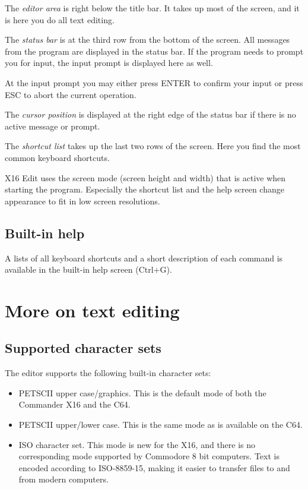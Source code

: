 \documentclass{article}
\begin{document}
        The \textit{editor area} is right below the title bar. It takes up most of the screen, and
        it is here you do all text editing.

        The \textit{status bar} is at the third row from the bottom of the screen. All messages
        from the program are displayed in the status bar. If the program needs to prompt you
        for input, the input prompt is displayed here as well. 
        
        At the input prompt you may either press ENTER to confirm your input or press ESC 
        to abort the current operation.

        The \textit{cursor position} is displayed at the right edge of the status bar if
        there is no active message or prompt.

        The \textit{shortcut list} takes up the last two rows of the screen. Here you find
        the most common keyboard shortcuts.
        
        X16 Edit uses the screen mode (screen height and width) that is active when starting
        the program. Especially the shortcut list and the help screen change appearance to fit in 
        low screen resolutions.

    \subsection{Built-in help}
        A lists of all keyboard shortcuts and a short description 
        of each command is available in the built-in help screen (Ctrl+G). 
    
\section{More on text editing}

    \subsection{Supported character sets}
        The editor supports the following built-in character sets:

        \begin{itemize}
            \item PETSCII upper case/graphics. This is the default mode of both the Commander X16 and the C64.

            \item PETSCII upper/lower case. This is the same mode as is available on the C64.

            \item ISO character set. This mode is new for the X16, and there is no corresponding mode 
            supported by Commodore 8 bit computers. Text is encoded according to ISO-8859-15, making it
            easier to transfer files to and from modern computers.
        \end{itemize}
\end{document}
